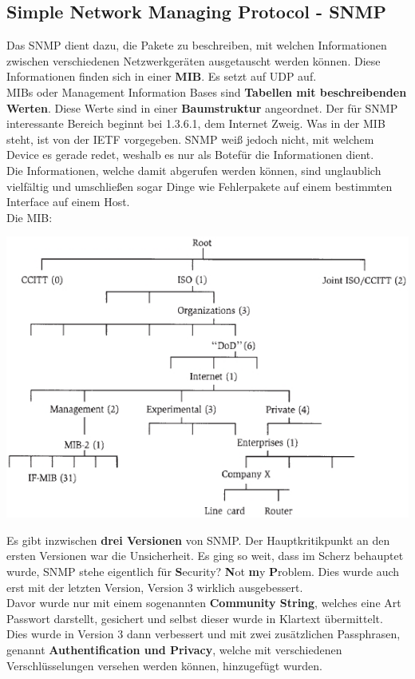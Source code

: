 \documentclass[12pt,a4paper]{report}
\begin{document}
\subsection{Simple Network Managing Protocol - SNMP}
Das SNMP dient dazu, die Pakete zu beschreiben, mit welchen Informationen zwischen verschiedenen Netzwerkgeräten ausgetauscht werden können. Diese Informationen finden sich in einer \textbf{MIB}. Es setzt auf UDP auf.\\

MIBs oder Management Information Bases sind \textbf{Tabellen mit beschreibenden Werten}. Diese Werte sind in einer \textbf{Baumstruktur} angeordnet. Der für SNMP interessante Bereich beginnt bei 1.3.6.1, dem Internet Zweig. Was in der MIB steht, ist von der IETF vorgegeben. SNMP weiß jedoch nicht, mit welchem Device es gerade redet, weshalb es nur als \glqq Bote\grqq für die Informationen dient.\\
Die Informationen, welche damit abgerufen werden können, sind unglaublich vielfältig und umschließen sogar Dinge wie Fehlerpakete auf einem bestimmten Interface auf einem Host.\\

Die MIB:
\begin{center}
\includegraphics[scale=0.7]{../docs/tarkes/pics/mib.jpg}
\end{center}

Es gibt inzwischen \textbf{drei Versionen} von SNMP. Der Hauptkritikpunkt an den ersten Versionen war die Unsicherheit. Es ging so weit, dass im Scherz behauptet wurde, SNMP stehe eigentlich für \textbf{S}ecurity? \textbf{N}ot \textbf{m}y \textbf{P}roblem. Dies wurde auch erst mit der letzten Version, Version 3 wirklich ausgebessert.\\
Davor wurde nur mit einem sogenannten \textbf{Community String}, welches eine Art Passwort darstellt, gesichert und selbst dieser wurde in Klartext übermittelt.\\
Dies wurde in Version 3 dann verbessert und mit zwei zusätzlichen Passphrasen, genannt \textbf{Authentification und Privacy}, welche mit verschiedenen Verschlüsselungen versehen werden können, hinzugefügt wurden.\\
\end{document}
